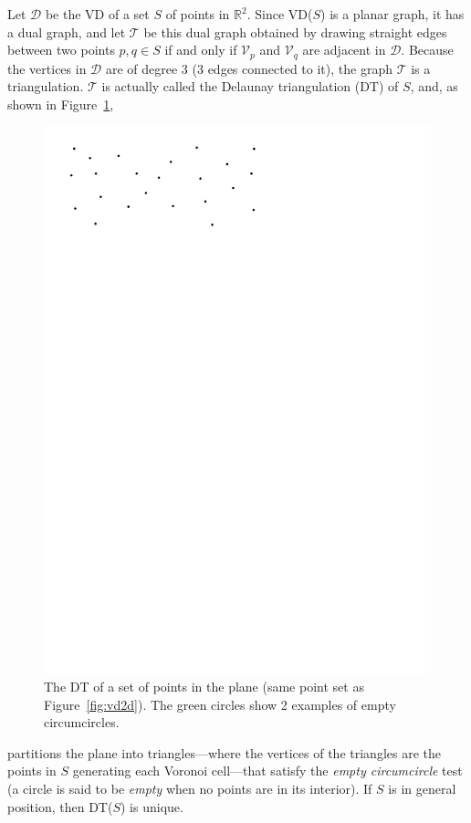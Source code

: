Let $\mathcal{D}$ be the VD of a set $S$ of points in $\mathbb{R}^2$. 
Since VD($S$) is a planar graph, it has a dual graph, and let $\mathcal{T}$ be this dual graph obtained by drawing straight edges between two points $p,q \in S$ if and only if $\mathcal{V}_{p}$ and $\mathcal{V}_{q}$ are adjacent in $\mathcal{D}$. 
Because the vertices in $\mathcal{D}$ are of degree 3 (3 edges connected to it), the graph $\mathcal{T}$ is a triangulation. 
$\mathcal{T}$ is actually called the Delaunay triangulation (DT) of $S$, and, as shown in Figure~\ref{fig:dt2da}, 
\begin{figure}
  \centering
   \includegraphics[page=4,width=\textwidth]{figs/vd2d}
  \caption{The DT of a set of points in the plane (same point set as Figure~\ref{fig:vd2d}). The green circles show 2 examples of empty circumcircles.}%
\label{fig:dt2da}
\end{figure}
partitions the plane into triangles---where the vertices of the triangles are the points in $S$ generating each Voronoi cell---that satisfy the \emph{empty circumcircle} test (a circle is said to be \emph{empty} when no points are in its interior). 
If $S$ is in general position, then DT($S$) is unique.

